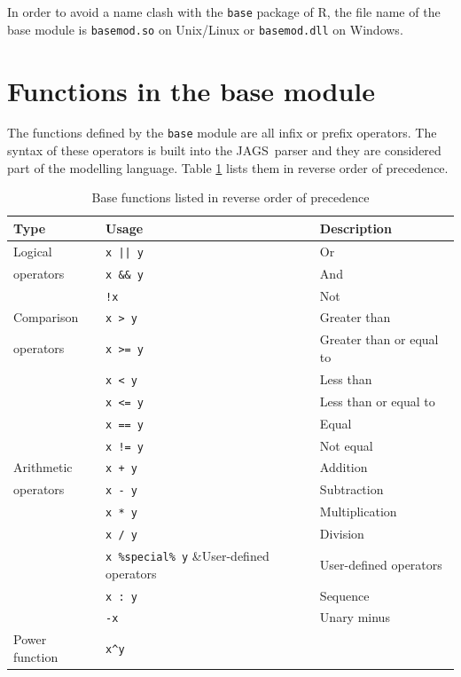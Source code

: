 \documentclass[11pt, a4paper, titlepage]{report}
\newcommand{\JAGS}{\textsf{JAGS}}
\newcommand{\R}{\textsf{R}}
\begin{document}
In order to avoid a name clash with the \texttt{base} package of \R,
the file name of the base module is \texttt{basemod.so} on Unix/Linux
or \texttt{basemod.dll} on Windows.

\section{Functions in the base module}
\label{section:base:functions}

The functions defined by the \texttt{base} module are all infix or
prefix operators. The syntax of these operators is built into the
\JAGS\ parser and they are considered part of the modelling language.
Table \ref{table:base:functions} lists them in reverse order of
precedence.

\begin{table}[h]
\begin{center}
\begin{tabular}{lll}
\hline
Type & Usage & Description\\ 
\hline
Logical           & \verb+x || y+ & Or \\
operators         & \verb+x && y+ & And \\
                  & \verb+!x+     & Not \\
\hline
Comparison  & \verb+x > y+ & Greater than\\
operators   & \verb+x >= y+ & Greater than or equal to  \\
            & \verb+x < y+ & Less than \\
            & \verb+x <= y+ & Less than or equal to \\
            & \verb+x == y+ & Equal \\
            & \verb+x != y+ & Not equal \\
\hline
Arithmetic  & \verb-x + y- & Addition \\
operators   & \verb+x - y+ & Subtraction\\
            & \verb+x * y+ & Multiplication \\
            & \verb+x / y+ & Division \\
            & \verb+x %special% y+ &User-defined operators\\
            & \verb+x : y+ & Sequence \\
            & \verb+-x+ & Unary minus\\
\hline
Power function & \verb+x^y+ & \\
\hline
\end{tabular}
\caption{Base functions listed in reverse order of precedence 
  \label{table:base:functions}}
\end{center}
\end{table}
\end{document}
